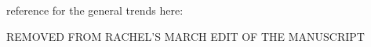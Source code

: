 









reference for the general trends here: \cite{Miller2011, Inoglu2010, Zuo2016, Ranea2008}





REMOVED FROM RACHEL'S MARCH EDIT OF THE MANUSCRIPT





